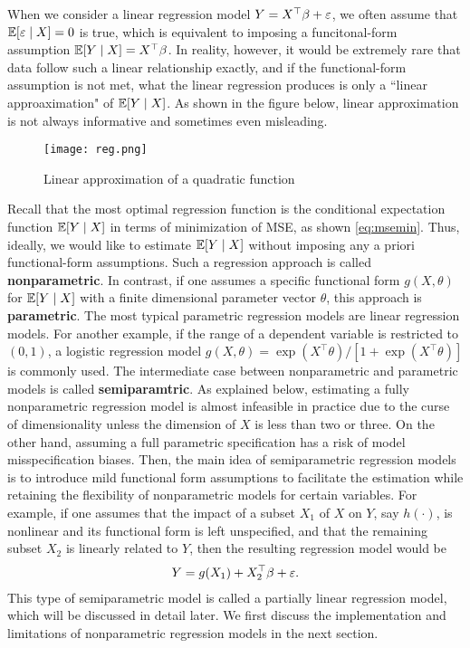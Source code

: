 \documentclass[11pt, A4paper, openany, uplatex]{book}
\begin{document}
When we consider a linear regression model $Y = X^\top\beta + \varepsilon$, we often assume that $\mathbb{E}[\varepsilon \mid X] = 0$ is true, which is equivalent to imposing a funcitonal-form assumption $\mathbb{E}[Y \mid X] = X^\top\beta$.
In reality, however, it would be extremely rare that data follow such a linear relationship exactly, and if the functional-form assumption is not met, what the linear regression produces is only a ``linear approaximation" of $\mathbb{E}[Y \mid X]$.
As shown in the figure below, linear approximation is not always informative and sometimes even misleading.

\begin{figure}[h!]
	\begin{center}
		\texttt{[image: reg.png]}
		\caption{Linear approximation of a quadratic function}
	\end{center}
\end{figure}

Recall that the most optimal regression function is the conditional expectation function $\mathbb{E} [Y \mid X]$ in terms of minimization of MSE, as shown \eqref{eq:msemin}.
Thus, ideally, we would like to estimate $\mathbb{E} [Y \mid X]$ without imposing any a priori functional-form assumptions.
Such a regression approach is called \textbf{nonparametric}.
In contrast, if one assumes a specific functional form $g(X, \theta)$ for $\mathbb{E}[Y \mid X]$ with a finite dimensional parameter vector $\theta$, this approach is \textbf{parametric}.
The most typical parametric regression models are linear regression models.
For another example, if the range of a dependent variable is restricted to $(0,1)$, a logistic regression model $g(X, \theta) = \exp(X^\top \theta)/[1 + \exp(X^\top \theta)]$ is commonly used. 
The intermediate case between nonparametric and parametric models is called \textbf{semiparamtric}.
As explained below, estimating a fully nonparametric regression model is almost infeasible in practice due to the curse of dimensionality unless the dimension of $X$ is less than two or three.
On the other hand, assuming a full parametric specification has a risk of model misspecification biases.
Then, the main idea of semiparametric regression models is to introduce mild functional form assumptions to facilitate the estimation while retaining the flexibility of nonparametric models for certain variables.
For example, if one assumes that the impact of a subset $X_1$ of $X$ on $Y$, say $h(\cdot)$, is nonlinear and its functional form is left unspecified, and that the remaining subset $X_2$ is linearly related to $Y$, then the resulting regression model would be 
\begin{align*}
	Y = g(X_1) + X_2^\top\beta + \varepsilon.
\end{align*}
This type of semiparametric model is called a partially linear regression model, which will be discussed in detail later.
We first discuss the implementation and limitations of nonparametric regression models in the next section.
\end{document}
